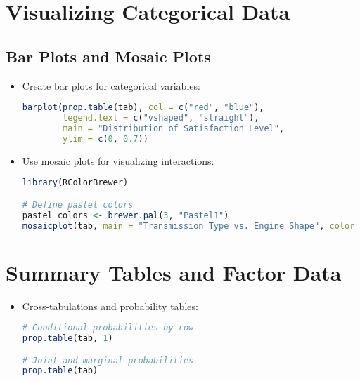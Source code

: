 \documentclass{article}
\begin{document}
\section{Visualizing Categorical Data}
\subsection{Bar Plots and Mosaic Plots}
\begin{itemize}
    \item Create bar plots for categorical variables:
\begin{lstlisting}[language=R]
barplot(prop.table(tab), col = c("red", "blue"),
        legend.text = c("vshaped", "straight"),
        main = "Distribution of Satisfaction Level",
        ylim = c(0, 0.7))
\end{lstlisting}

\item Use mosaic plots for visualizing interactions:
\begin{lstlisting}[language=R]
library(RColorBrewer)

# Define pastel colors
pastel_colors <- brewer.pal(3, "Pastel1")
mosaicplot(tab, main = "Transmission Type vs. Engine Shape", color = pastel_colors)
\end{lstlisting}
\end{itemize}

\section{Summary Tables and Factor Data}
\begin{itemize}
    \item Cross-tabulations and probability tables:
\begin{lstlisting}[language=R]
# Conditional probabilities by row
prop.table(tab, 1)

# Joint and marginal probabilities
prop.table(tab)
\end{lstlisting}
\end{itemize}
\end{document}
